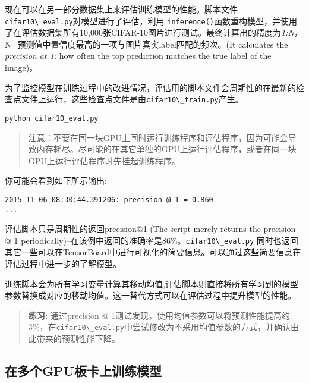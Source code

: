 现在可以在另一部分数据集上来评估训练模型的性能。脚本文件\lstinline{cifar10\_eval.py}对模型进行了评估，利用
\lstinline{inference()}函数重构模型，并使用了在评估数据集所有10,000张CIFAR-10图片进行测试。最终计算出的精度为\emph{1:N}，N=预测值中置信度最高的一项与图片真实label匹配的频次。(It
calculates the \emph{precision at 1:} how often the top prediction
matches the true label of the image)。

为了监控模型在训练过程中的改进情况，评估用的脚本文件会周期性的在最新的检查点文件上运行，这些检查点文件是由\lstinline{cifar10\_train.py}产生。

\begin{lstlisting}
python cifar10_eval.py
\end{lstlisting}

\begin{quote}
注意：不要在同一块GPU上同时运行训练程序和评估程序，因为可能会导致内存耗尽。尽可能的在其它单独的GPU上运行评估程序，或者在同一块GPU上运行评估程序时先挂起训练程序。
\end{quote}

你可能会看到如下所示输出:

\begin{lstlisting}
2015-11-06 08:30:44.391206: precision @ 1 = 0.860
...
\end{lstlisting}

评估脚本只是周期性的返回precision@1 (The script merely returns the
precision @ 1
periodically)--在该例中返回的准确率是86\%。\lstinline{cifar10\_eval.py}
同时也返回其它一些可以在TensorBoard中进行可视化的简要信息。可以通过这些简要信息在评估过程中进一步的了解模型。

训练脚本会为所有学习变量计算其\href{https://github.com/jikexueyuanwiki/tensorflow-zh/blob/master/SOURCE/api_docs/python/train.md\#ExponentialMovingAverage}{移动均值},评估脚本则直接将所有学习到的模型参数替换成对应的移动均值。这一替代方式可以在评估过程中提升模型的性能。

\begin{quote}
\textbf{练习:} 通过precision @
1测试发现，使用均值参数可以将预测性能提高约3\%，在\lstinline{cifar10\_eval.py}中尝试修改为不采用均值参数的方式，并确认由此带来的预测性能下降。
\end{quote}

\subsection{在多个GPU板卡上训练模型
}\label{ux5728ux591aux4e2agpuux677fux5361ux4e0aux8badux7ec3ux6a21ux578b}

